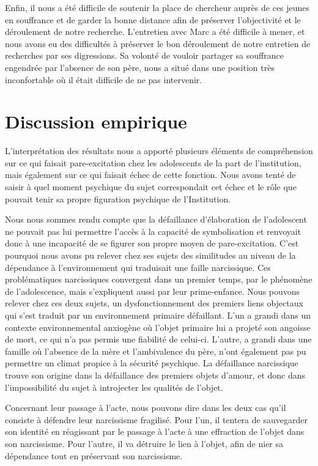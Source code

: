 \documentclass[12pt, a4paper]{book}
\begin{document}
\begin{spacing}{1.5}
Enfin, il nous a été difficile de soutenir la place de chercheur auprès de ces jeunes en souffrance et de garder la bonne distance afin de préserver l'objectivité et le déroulement de notre recherche. L'entretien avec Marc a été difficile à mener, et nous avons eu des difficultés à préserver le bon déroulement de notre entretien de recherches par ses digressions. Sa volonté de vouloir partager sa souffrance engendrée par l'absence de son père, nous a situé dans une position très inconfortable où il était difficile de ne pas intervenir.

\section{Discussion empirique}

L'interprétation des résultats nous a apporté plusieurs éléments de compréhension sur ce qui faisait pare-excitation chez les adolescents de la part de l'institution, mais également sur ce qui faisait échec de cette fonction. Nous avons tenté de saisir à quel moment psychique du sujet correspondait cet échec et le rôle que pouvait tenir sa propre figuration psychique de l'Institution.

Nous nous sommes rendu  compte que la défaillance d'élaboration de l'adolescent  ne pouvait pas lui permettre l'accès à la capacité de symbolisation et  renvoyait donc à une incapacité de se figurer son propre moyen de pare-excitation. C'est pourquoi nous avons pu relever chez ses sujets des similitudes au niveau de la dépendance à l'environnement qui traduisait une faille narcissique. Ces problématiques narcissiques convergent dans un premier temps, par le phénomène de l'adolescence, mais s'expliquent aussi par leur prime-enfance. Nous pouvons relever chez ces deux sujets, un dysfonctionnement des premiers liens objectaux qui s'est traduit par un environnement primaire défaillant. L'un a grandi dans un contexte environnemental anxiogène où l'objet primaire lui a projeté son angoisse de mort, ce qui n'a pas permis une fiabilité de celui-ci. L'autre, a grandi dans une famille où l'absence de la mère et l'ambivalence du père, n'ont également pas pu permettre un climat propice à la sécurité psychique. La défaillance narcissique trouve son origine dans la défaillance des premiers objets d'amour, et donc dans l'impossibilité du sujet à introjecter les qualités de l'objet.

Concernant leur passage à l'acte, nous pouvons dire dans les deux cas qu'il consiste  à   défendre leur narcissisme fragilisé. Pour l'un, il tentera de sauvegarder son identité en réagissant par le passage à l'acte à une effraction de l'objet dans son narcissisme. Pour l'autre, il va détruire le lien à l'objet, afin de nier sa dépendance tout en préservant son narcissisme. 


\end{spacing}
\end{document}
